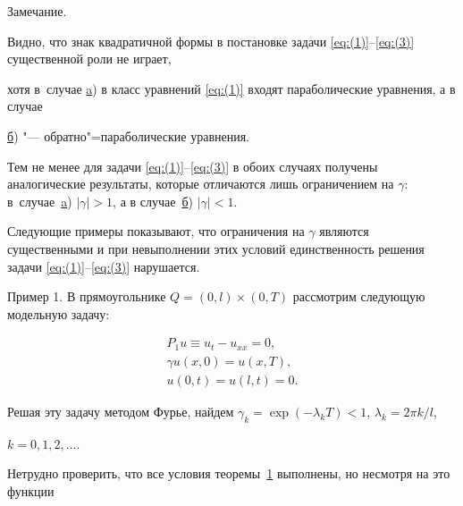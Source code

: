 \smallskip



{\small \sc Замечание.} 

Видно, что знак квадратичной формы в постановке задачи \eqref{eq:(1)}--\eqref{eq:(3)} существенной роли не играет,

хотя в~случае \hyperlink{dzh:a}{a}) в класс уравнений \eqref{eq:(1)} входят параболические уравнения, а в случае 

\hyperlink{dzh:b}{б}) "--- обратно"=параболические уравнения.

Тем не менее для задачи \eqref{eq:(1)}--\eqref{eq:(3)} в обоих случаях получены аналогические результаты, которые отличаются лишь ограничением на $\gamma $:  в~случае~\hyperlink{dzh:a}{a}) $|\gamma |>1$, а в случае~\hyperlink{dzh:b}{б}) $|\gamma|<1.$ 

Следующие примеры показывают, что ограничения на $\gamma$ являются существенными и при невыполнении этих условий  единственность решения задачи \eqref{eq:(1)}--\eqref{eq:(3)} нарушается.








\smallskip



{\small\sc Пример 1.}  В прямоугольнике  $Q=(0, l)\times (0, T)$ рассмотрим следующую модельную задачу:

\begin{gather}

P_1u \equiv u_t-u_{xx} =0, 

\label{eq:new(1)}

\\

\gamma u (x, 0)=u(x,T), 

\label{eq:new(2)}

\\

u(0,t)=u(l ,t)=0.

\label{eq:new(3)}

\end{gather}

Решая эту задачу методом Фурье, найдем $\gamma _k= \exp (-\lambda _k T)<1$, $\lambda _k= 2\pi k/l$,

$k=0, 1, 2, \dots$.

Нетрудно проверить, что все условия теоремы~\hyperlink{dzh:th1}{1} выполнены, но несмотря на это функции 

